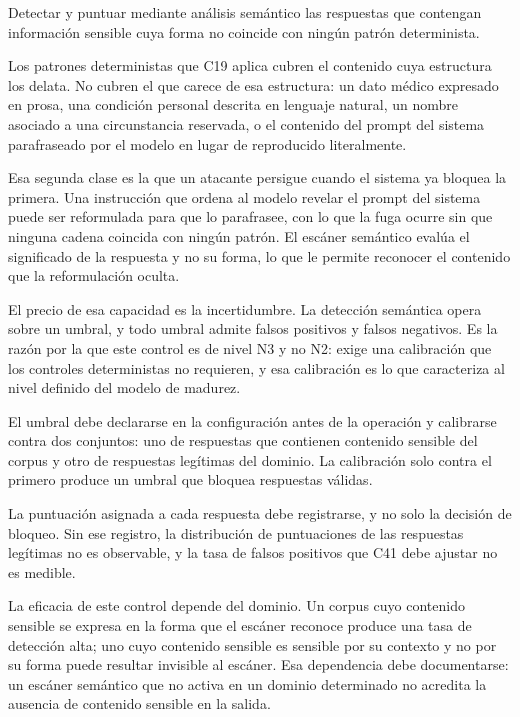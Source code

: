 Detectar y puntuar mediante análisis semántico las respuestas que contengan información sensible cuya forma no coincide con ningún patrón determinista.

Los patrones deterministas que C19 aplica cubren el contenido cuya estructura los delata. No cubren el que carece de esa estructura: un dato médico expresado en prosa, una condición personal descrita en lenguaje natural, un nombre asociado a una circunstancia reservada, o el contenido del prompt del sistema parafraseado por el modelo en lugar de reproducido literalmente.

Esa segunda clase es la que un atacante persigue cuando el sistema ya bloquea la primera. Una instrucción que ordena al modelo revelar el prompt del sistema puede ser reformulada para que lo parafrasee, con lo que la fuga ocurre sin que ninguna cadena coincida con ningún patrón. El escáner semántico evalúa el significado de la respuesta y no su forma, lo que le permite reconocer el contenido que la reformulación oculta.

El precio de esa capacidad es la incertidumbre. La detección semántica opera sobre un umbral, y todo umbral admite falsos positivos y falsos negativos. Es la razón por la que este control es de nivel N3 y no N2: exige una calibración que los controles deterministas no requieren, y esa calibración es lo que caracteriza al nivel definido del modelo de madurez.

El umbral debe declararse en la configuración antes de la operación y calibrarse contra dos conjuntos: uno de respuestas que contienen contenido sensible del corpus y otro de respuestas legítimas del dominio. La calibración solo contra el primero produce un umbral que bloquea respuestas válidas.

La puntuación asignada a cada respuesta debe registrarse, y no solo la decisión de bloqueo. Sin ese registro, la distribución de puntuaciones de las respuestas legítimas no es observable, y la tasa de falsos positivos que C41 debe ajustar no es medible.

La eficacia de este control depende del dominio. Un corpus cuyo contenido sensible se expresa en la forma que el escáner reconoce produce una tasa de detección alta; uno cuyo contenido sensible es sensible por su contexto y no por su forma puede resultar invisible al escáner. Esa dependencia debe documentarse: un escáner semántico que no activa en un dominio determinado no acredita la ausencia de contenido sensible en la salida.

